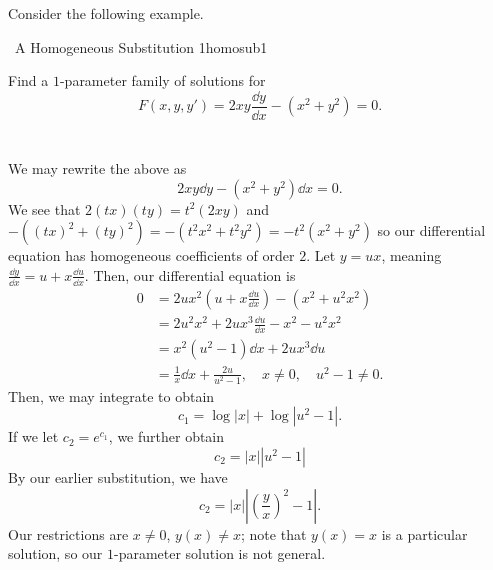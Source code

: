         Consider the following example.
        \begin{example}{\Difficulty\,\Difficulty\,\,A Homogeneous Substitution 1}{homosub1}
            
            Find a \(1\)-parameter family of solutions for 
            \begin{equation*}
                F(x,y,y')=2xy\frac{\dd y}{\dd x}-(x^2+y^2)=0.
            \end{equation*}
            \\
            \\
            We may rewrite the above as
            \begin{equation*}
                2xy\dd y-(x^2+y^2)\dd x=0.
            \end{equation*}
            We see that \(2(tx)(ty)=t^2(2xy)\) and \(-((tx)^2+(ty)^2)=-(t^2x^2+t^2y^2)=-t^2(x^2+y^2)\) so our differential equation has homogeneous coefficients of order \(2\). Let \(y=ux\), meaning \(\frac{\dd y}{\dd x}=u+x\frac{\dd u}{\dd x}\). Then, our differential equation is
            \begin{align*}
                0&=2ux^2\left(u+x\frac{\dd u}{\dd x}\right)-(x^2+u^2x^2) \\
                &=2u^2x^2+2ux^3\frac{\dd u}{\dd x}-x^2-u^2x^2 \\
                &=x^2(u^2-1)\dd x+2ux^3\dd u \\
                &=\frac{1}{x}\dd x+\frac{2u}{u^2-1},\quad x\neq0,\quad u^2-1\neq0.
            \end{align*}
            Then, we may integrate to obtain
            \begin{equation*}
                c_1=\log|x|+\log|u^2-1|.
            \end{equation*}
            If we let \(c_2=e^{c_1}\), we further obtain
            \begin{equation*}
                c_2=|x||u^2-1|
            \end{equation*}
            By our earlier substitution, we have 
            \begin{equation*}
                c_2=|x|\left|\left(\frac{y}{x}\right)^2-1\right|.
            \end{equation*}
            Our restrictions are \(x\neq0\), \(y(x)\neq x\); note that \(y(x)=x\) is a particular solution, so our \(1\)-parameter solution is not general.

        \end{example}
        \pagebreak
